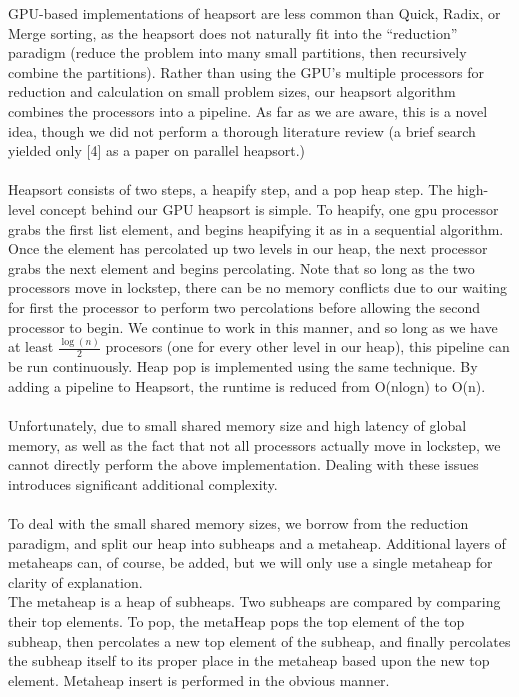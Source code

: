 \documentclass{article}
\begin{document}
\begin{enumerate}
  GPU-based implementations of heapsort are less common than Quick, Radix, or Merge sorting, as the heapsort does not naturally fit into the ``reduction'' paradigm (reduce the problem into many small partitions, then recursively combine the partitions).  Rather than using the GPU's multiple processors for reduction and calculation on small problem sizes, our heapsort algorithm combines the processors into a pipeline.  As far as we are aware, this is a novel idea, though we did not perform a thorough literature review (a brief search yielded only [4] as a paper on parallel heapsort.)\\
\\
  Heapsort consists of two steps, a heapify step, and a pop heap step.  The high-level concept behind our GPU heapsort is simple.  To heapify, one gpu processor grabs the first list element, and begins heapifying it as in a sequential algorithm.  Once the element has percolated up two levels in our heap, the next processor grabs the next element and begins percolating.  Note that so long as the two processors move in lockstep, there can be no memory conflicts due to our waiting for first the processor to perform two percolations before allowing the second processor to begin.  We continue to work in this manner, and so long as we have at least $\frac{\log(n)}{2}$ procesors (one for every other level in our heap), this pipeline can be run continuously.  Heap pop is implemented using the same technique.  By adding a pipeline to Heapsort, the runtime is reduced from O(nlogn) to O(n).\\
\\
Unfortunately, due to small shared memory size and high latency of global memory, as well as the fact that not all processors actually move in lockstep, we cannot directly perform the above implementation.  Dealing with these issues introduces significant additional complexity.\\
\\
To deal with the small shared memory sizes, we borrow from the reduction paradigm, and split our heap into subheaps and a metaheap.  Additional layers of metaheaps can, of course, be added, but we will only use a single metaheap for clarity of explanation.\\
The metaheap is a heap of subheaps.  Two subheaps are compared by comparing their top elements.  To pop, the metaHeap pops the top element of the top subheap, then percolates a new top element of the subheap, and finally percolates the subheap itself to its proper place in the metaheap based upon the new top element.  Metaheap insert is performed in the obvious manner.\\

\end{enumerate}
\end{document}
